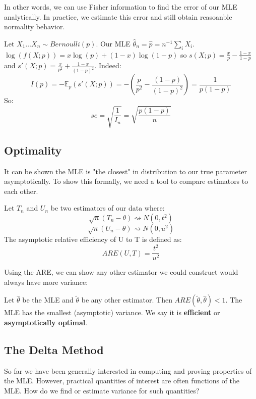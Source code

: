 \documentclass[10pt]{article}
\begin{document}
In other words, we can use Fisher information to find the error of our MLE
analytically. In practice, we estimate this error and still obtain reasoanble
normality behavior.

\begin{example}[i.i.d. Bernoulli]
    Let $X_1 \dots X_n \sim Bernoulli(p)$. Our MLE $\hat{\theta}_n = \hat{p} =
    n^{-1}\sum_i X_i$. $\log(f(X;p)) = x\log(p) + (1-x)\log(1-p)$ so $s(X;p) =
    \frac{x}{p} - \frac{1-x}{1-p}$ and $s'(X;p) = \frac{x}{p^2} +
    \frac{1-x}{(1-p)^2}$. 
    Indeed:
    \[I(p) = -\mathbb{E}_p(s'(X;p)) = -(\frac{p}{p^2} - \frac{(1-p)}{(1-p)^2}) = \frac{1}{p(1-p)}\]
    So:
    \[se = \sqrt{\frac{1}{I_n}} = \sqrt{\frac{p(1-p)}{n}}\]
\end{example}

\subsection{Optimality}

It can be shown the MLE is "the closest" in distribution to our true parameter
asymptotically. To show this formally, we need a tool to compare estimators to
each other.

\begin{definition}
    Let $T_n$ and $U_n$ be two estimators of our data where:
    \[\sqrt{n}(T_n - \theta) \rightsquigarrow N(0, t^2)\]
    \[\sqrt{n}(U_n - \theta) \rightsquigarrow N(0, u^2)\]
    The asymptotic relative efficiency of U to T is defined as:
    \[ ARE(U, T) = \frac{t^2}{u^2}\]
\end{definition}

Using the ARE, we can show any other estimator we could construct would always
have more variance:

\begin{theorem}
    Let $\hat{\theta}$ be the MLE and $\tilde{\theta}$ be any other estimator.
    Then $ARE(\tilde{\theta}, \hat{\theta}) < 1$. The MLE has the smallest
    (asymptotic) variance. We say it is \textbf{efficient} or
    \textbf{asymptotically optimal}.
\end{theorem}

\subsection{The Delta Method}

So far we have been generally interested in computing and proving properties of
the MLE. However, practical quantities of interest are often functions of the
MLE. How do we find or estimate variance for such quantities?
\end{document}
